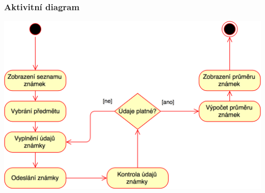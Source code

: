 \documentclass[a4paper,10pt,titlepage]{article}
\begin{document}
	\subsubsection*{Aktivitní diagram}
	\includegraphics[width=\textwidth]{vis_uc2_activity}
	\vspace{5mm}
	
\end{document}
